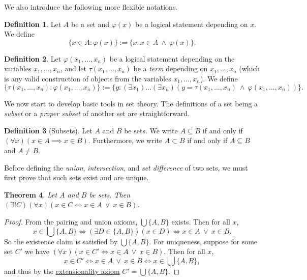 \documentclass[a4paper,11pt]{article}
\theoremstyle{plain}
\newtheorem{thm}{Theorem}[subsection]
\theoremstyle{definition}
\newtheorem{defn}[thm]{Definition}
\theoremstyle{remark}
\begin{document}
We also introduce the following more flexible notations.

\begin{defn}
\label{defn:class2}
Let $A$ be a set and $\varphi(x)$ be a logical statement depending on $x$. We define
\[\{x \in A : \varphi(x)\} := \{x : x \in A \ \land \ \varphi(x)\}.\]
\end{defn}

\begin{defn}
\label{defn:class3}
Let $\varphi(x_1,\dots,x_n)$ be a logical statement depending on the variables $x_1,\dots,x_n$, and let $\tau(x_1,\dots,x_n)$ be a \textit{term} depending on $x_1,\dots,x_n$ (which is any valid construction of objects from the variables $x_1,\dots,x_n$). We define 
$$
\{\tau(x_1,\dots,x_n) : \varphi(x_1,\dots,x_n)\} := \{y : (\exists x_1)\dots(\exists x_n)(y = \tau(x_1,\dots,x_n) \ \land \ \varphi(x_1,\dots,x_n))\}. 
$$
\end{defn}

We now start to develop basic tools in set theory. The definitions of a set being a \textit{subset} or a \textit{proper subset} of another set are straightforward.
\begin{defn}[Subsets]
\label{defn:subset}
Let $A$ and $B$ be sets. We write $A \subseteq B$ if and only if $(\forall x)(x \in A \implies x \in B)$. Furthermore, we write $A \subset B$ if and only if $A \subseteq B$ and $A \neq B$.
\end{defn}

Before defining the \textit{union}, \textit{intersection}, and \textit{set difference} of two sets, we must first prove that such sets exist and are unique.

\begin{thm}
\label{thm:UnionOfSets}
Let $A$ and $B$ be sets. Then $(\exists! C)(\forall x)(x\in C \iff x \in A \ \lor \ x \in B)$.
\end{thm}
\begin{proof}
From the pairing and union axioms, $\bigcup \{A,B\}$ exists. Then for all $x$,
$$
x \in \bigcup \{A, B\} \iff (\exists D\in\{A,B\})(x \in D) \iff x \in A \ \lor \ x \in B.
$$
So the existence claim is satisfied by $\bigcup \{A, B\}$. For uniqueness, suppose for some set $C'$ we have $(\forall x)(x\in C' \iff x \in A \ \lor \ x \in B)$. Then for all $x$,
\[
x \in C' \iff x \in A \ \lor \ x \in B \iff x \in \bigcup\{A,B\},
\]
and thus by the \hyperref[axiom:extensionality]{extensionality axiom} $C' = \bigcup \{A, B\}$.
\end{proof}
\end{document}
